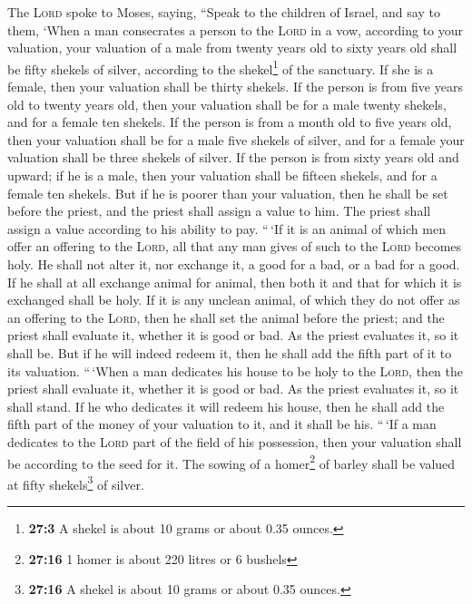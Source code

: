  The \textsc{Lord} spoke to Moses, saying, 
``Speak to the children of Israel, and say to them, `When a man
consecrates a person to the \textsc{Lord} in a vow, according to your
valuation,  your valuation of a male from twenty years old
to sixty years old shall be fifty shekels of silver, according to the
shekel\footnote{\textbf{27:3} A shekel is about 10 grams or about 0.35
  ounces.} of the sanctuary.  If she is a female, then
your valuation shall be thirty shekels.  If the person is
from five years old to twenty years old, then your valuation shall be
for a male twenty shekels, and for a female ten shekels. 
If the person is from a month old to five years old, then your valuation
shall be for a male five shekels of silver, and for a female your
valuation shall be three shekels of silver.  If the person
is from sixty years old and upward; if he is a male, then your valuation
shall be fifteen shekels, and for a female ten shekels. 
But if he is poorer than your valuation, then he shall be set before the
priest, and the priest shall assign a value to him. The priest shall
assign a value according to his ability to pay.  ``\,`If
it is an animal of which men offer an offering to the \textsc{Lord}, all
that any man gives of such to the \textsc{Lord} becomes holy.
 He shall not alter it, nor exchange it, a good for a
bad, or a bad for a good. If he shall at all exchange animal for animal,
then both it and that for which it is exchanged shall be holy.
 If it is any unclean animal, of which they do not offer
as an offering to the \textsc{Lord}, then he shall set the animal before
the priest;  and the priest shall evaluate it, whether it
is good or bad. As the priest evaluates it, so it shall be.
 But if he will indeed redeem it, then he shall add the
fifth part of it to its valuation.  ``\,`When a man
dedicates his house to be holy to the \textsc{Lord}, then the priest
shall evaluate it, whether it is good or bad. As the priest evaluates
it, so it shall stand.  If he who dedicates it will
redeem his house, then he shall add the fifth part of the money of your
valuation to it, and it shall be his.  ``\,`If a man
dedicates to the \textsc{Lord} part of the field of his possession, then
your valuation shall be according to the seed for it. The sowing of a
homer\footnote{\textbf{27:16} 1 homer is about 220 litres or 6 bushels}
of barley shall be valued at fifty shekels\footnote{\textbf{27:16} A
  shekel is about 10 grams or about 0.35 ounces.} of silver.
